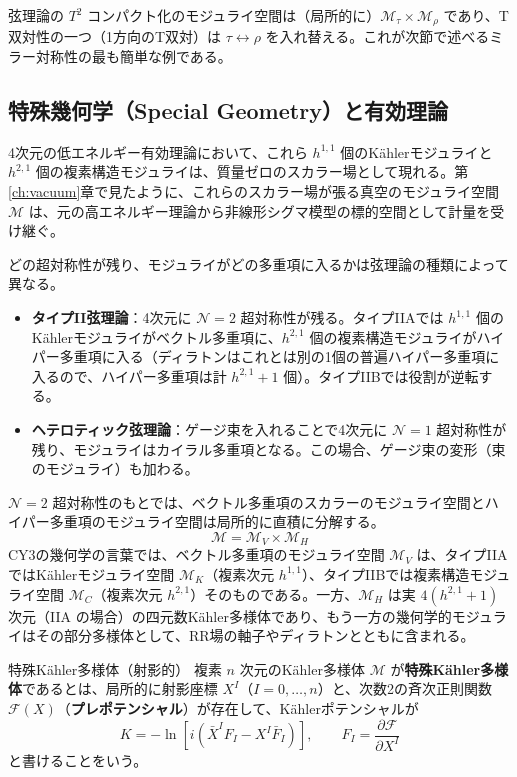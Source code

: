\documentclass[uplatex, dvipdfmx, book]{jsbook}
\let\origsubsection\subsection
\let\origsubsubsection\subsubsection
\renewcommand{\section}{\origsubsection}
\renewcommand{\subsection}{\origsubsubsection}
\renewcommand{\subsubsection}{\paragraph}
\begin{document}
弦理論の $T^2$ コンパクト化のモジュライ空間は（局所的に）$\mathcal{M}_\tau \times \mathcal{M}_\rho$ であり、T双対性の一つ（1方向のT双対）は $\tau \leftrightarrow \rho$ を入れ替える。これが次節で述べるミラー対称性の最も簡単な例である。

\section{特殊幾何学（Special Geometry）と有効理論}

4次元の低エネルギー有効理論において、これら $h^{1,1}$ 個のK\"ahlerモジュライと $h^{2,1}$ 個の複素構造モジュライは、質量ゼロのスカラー場として現れる。第\ref{ch:vacuum}章で見たように、これらのスカラー場が張る真空のモジュライ空間 $\mathcal{M}$ は、元の高エネルギー理論から非線形シグマ模型の標的空間として計量を受け継ぐ。

どの超対称性が残り、モジュライがどの多重項に入るかは弦理論の種類によって異なる。
\begin{itemize}
    \item \textbf{タイプII弦理論}：4次元に $\mathcal{N} = 2$ 超対称性が残る。タイプIIAでは $h^{1,1}$ 個のK\"ahlerモジュライがベクトル多重項に、$h^{2,1}$ 個の複素構造モジュライがハイパー多重項に入る（ディラトンはこれとは別の1個の普遍ハイパー多重項に入るので、ハイパー多重項は計 $h^{2,1} + 1$ 個）。タイプIIBでは役割が逆転する。
    \item \textbf{ヘテロティック弦理論}：ゲージ束を入れることで4次元に $\mathcal{N} = 1$ 超対称性が残り、モジュライはカイラル多重項となる。この場合、ゲージ束の変形（束のモジュライ）も加わる。
\end{itemize}

$\mathcal{N} = 2$ 超対称性のもとでは、ベクトル多重項のスカラーのモジュライ空間とハイパー多重項のモジュライ空間は局所的に直積に分解する。
\begin{equation}
    \mathcal{M} = \mathcal{M}_{V} \times \mathcal{M}_{H}
\end{equation}
CY3の幾何学の言葉では、ベクトル多重項のモジュライ空間 $\mathcal{M}_V$ は、タイプIIAではK\"ahlerモジュライ空間 $\mathcal{M}_K$（複素次元 $h^{1,1}$）、タイプIIBでは複素構造モジュライ空間 $\mathcal{M}_C$（複素次元 $h^{2,1}$）そのものである。一方、$\mathcal{M}_H$ は実 $4(h^{2,1} + 1)$ 次元（IIA の場合）の四元数K\"ahler多様体であり、もう一方の幾何学的モジュライはその部分多様体として、RR場の軸子やディラトンとともに含まれる。

\begin{mydef}{特殊K\"ahler多様体（射影的）}{}
複素 $n$ 次元のK\"ahler多様体 $\mathcal{M}$ が\textbf{特殊K\"ahler多様体}であるとは、局所的に射影座標 $X^I$（$I = 0, \dots, n$）と、次数2の斉次正則関数 $\mathcal{F}(X)$（\textbf{プレポテンシャル}）が存在して、K\"ahlerポテンシャルが
\begin{equation*}
    K = -\ln\left[ i\left( \bar{X}^I F_I - X^I \bar{F}_I \right) \right], \qquad F_I = \frac{\partial\mathcal{F}}{\partial X^I}
\end{equation*}
と書けることをいう。
\end{mydef}
\end{document}

